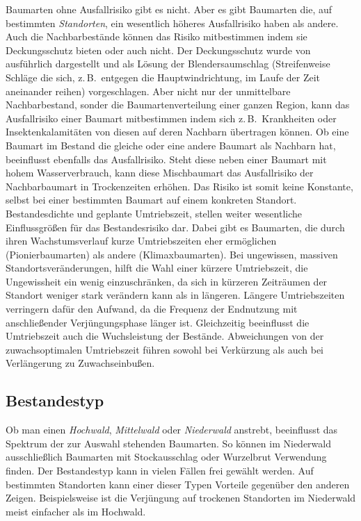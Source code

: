 \documentclass[twocolumn]{scrartcl}
\begin{document}
Baumarten ohne Ausfallrisiko gibt es nicht. Aber es gibt Baumarten
die, auf bestimmten \emph{Standorten}, ein wesentlich höheres
Ausfallrisiko haben als andere. Auch die Nachbarbestände können das
Risiko mitbestimmen indem sie Deckungsschutz bieten oder auch nicht.
Der Deckungsschutz wurde von
\cite{wagner1923DerBlendersaumschlagUndSeinSystem} ausführlich
dargestellt und als Lösung der Blendersaumschlag (Streifenweise
Schläge die sich, z.\,B.\ entgegen die Hauptwindrichtung, im Laufe der
Zeit aneinander reihen) vorgeschlagen. Aber nicht nur der unmittelbare
Nachbarbestand, sonder die Baumartenverteilung einer ganzen Region,
kann das Ausfallrisiko einer Baumart mitbestimmen indem sich z.\,B.\
Krankheiten oder Insektenkalamitäten von diesen auf deren Nachbarn
übertragen können. Ob eine Baumart im Bestand die gleiche oder eine
andere Baumart als Nachbarn hat, beeinflusst ebenfalls das
Ausfallrisiko. Steht diese neben einer Baumart mit hohem
Wasserverbrauch, kann diese Mischbaumart das Ausfallrisiko der
Nachbarbaumart in Trockenzeiten erhöhen. Das Risiko ist somit keine
Konstante, selbst bei einer bestimmten Baumart auf einem konkreten
Standort. Bestandesdichte und geplante Umtriebszeit, stellen weiter
wesentliche Einflussgrößen für das Bestandesrisiko dar. Dabei gibt es
Baumarten, die durch ihren Wachstumsverlauf kurze Umtriebszeiten eher
ermöglichen (Pionierbaumarten) als andere (Klimaxbaumarten). Bei
ungewissen, massiven Standortsveränderungen, hilft die Wahl einer
kürzere Umtriebszeit, die Ungewissheit ein wenig einzuschränken, da
sich in kürzeren Zeiträumen der Standort weniger stark verändern kann
als in längeren. Längere Umtriebszeiten verringern dafür den Aufwand,
da die Frequenz der Endnutzung mit anschließender Verjüngungsphase
länger ist. Gleichzeitig beeinflusst die Umtriebszeit auch die
Wuchsleistung der Bestände. Abweichungen von der zuwachsoptimalen
Umtriebszeit führen sowohl bei Verkürzung als auch bei Verlängerung zu
Zuwachseinbußen.

\subsection{Bestandestyp}
\label{ssec:bestandestyp}

Ob man einen \emph{Hochwald}, \emph{Mittelwald} oder \emph{Niederwald}
anstrebt, beeinflusst das Spektrum der zur Auswahl stehenden
Baumarten. So können im Niederwald ausschließlich Baumarten mit
Stockausschlag oder Wurzelbrut Verwendung finden. Der Bestandestyp
kann in vielen Fällen frei gewählt werden. Auf bestimmten Standorten
kann einer dieser Typen Vorteile gegenüber den anderen
Zeigen. Beispielsweise ist die Verjüngung auf trockenen Standorten im
Niederwald meist einfacher als im Hochwald.
\end{document}
